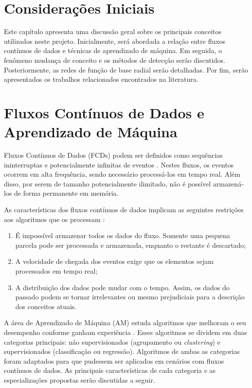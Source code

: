 \documentclass[qual, classic, a4paper]{ufbathesis}
\begin{document}
 \label{revisao_bibliografica}
\section{Considerações Iniciais}

Este capítulo apresenta uma discussão geral sobre os principais conceitos utilizados neste projeto.
%
Inicialmente, será abordada a relação entre fluxos contínuos de dados e técnicas de aprendizado de máquina.
%
Em seguida, o fenômeno mudança de conceito e os métodos de detecção serão discutidos.
%
Posteriormente, as redes de função de base radial serão detalhadas.
%
Por fim, serão apresentados os trabalhos relacionados encontrados na literatura.

\section{Fluxos Contínuos de Dados e Aprendizado de Máquina}

Fluxos Contínuos de Dados (FCDs) podem ser definidos como sequências ininterruptas e potencialmente infinitas de eventos \cite{Aggarwal:2006:DSM:1196418}.
%
Nestes fluxos, os eventos ocorrem em alta frequência, sendo necessário processá-los em tempo real.
%
Além disso, por serem de tamanho potencialmente ilimitado, não é possível armazená-los de forma permanente em memória.
%

As características dos fluxos contínuos de dados implicam as seguintes restrições aos algoritmos que os processam \cite{bifet2009data}:
%
\begin{enumerate}
    \item É impossível armazenar todos os dados do fluxo. Somente uma pequena parcela pode ser processada e armazenada, enquanto o restante é descartado;
    \item A velocidade de chegada dos eventos exige que os elementos sejam processados em tempo real;
    \item A distribuição dos dados pode mudar com o tempo. Assim, os dados do passado podem se tornar irrelevantes ou mesmo prejudiciais para a descrição dos conceitos atuais.
\end{enumerate}

A área de Aprendizado de Máquina (AM) estuda algoritmos que melhoram o seu desempenho conforme ganham experiência \cite{Mitchell:1997:ML:541177}.
%
Esses algoritmos se dividem em duas categorias principais: 
%
não supervisionados (agrupamento ou \textit{clustering}) e supervisionados (classificação ou regressão).
%
Algoritmos de ambas as categorias foram adaptados para que pudessem ser aplicados em cenários com fluxos contínuos de dados.
%
As principais características de cada categoria e as especializações propostas serão discutidas a seguir.
\end{document}
